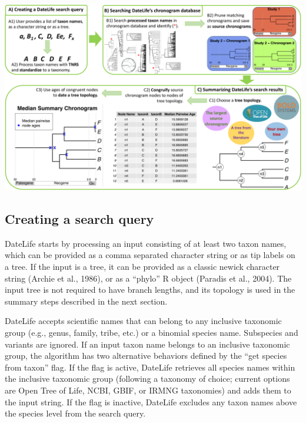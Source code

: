 \documentclass[
  man]{apa6}
\begin{document}
\begin{center}
\includegraphics[width = 6.5in]{../figures/figure1/figure1-new.pdf}
\label{fig:workflow}
\end{center}

\hypertarget{creating-a-search-query}{%
\subsection{Creating a search query}\label{creating-a-search-query}}

DateLife starts by processing an input consisting of at least two taxon names, which can be provided as a comma separated character string or as tip labels on a tree.
If the input is a tree, it can be provided as a classic newick character string (Archie et al., 1986), or as a ``phylo'' R object (Paradis et al., 2004).
The input tree is not required to have branch lengths, and its topology is used in the summary steps described in the next section.

DateLife accepts scientific names that can belong to any inclusive taxonomic group (e.g., genus, family, tribe, etc.) or a binomial species name. Subspecies and variants are ignored. If an input taxon name belongs to an inclusive taxonomic group, the algorithm has two alternative behaviors defined by the ``get species from taxon'' flag. If the flag is active, DateLife retrieves all species names within the inclusive taxonomic group (following a taxonomy of choice; current options are Open Tree of Life, NCBI, GBIF, or IRMNG taxonomies) and adds them to the input string.
If the flag is inactive, DateLife excludes any taxon names above the species level from the search query.
\end{document}
